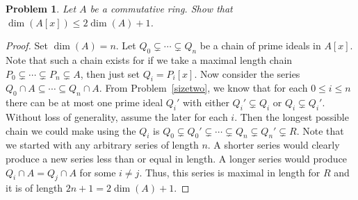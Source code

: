 \documentclass{article}
\newtheorem{problem}{Problem}
\begin{document}
\begin{problem}
Let $A$ be a commutative ring. Show that $\dim(A[x]) \leq 2 \dim(A) + 1$.
\end{problem}
\begin{proof}
Set $\dim(A) = n$. Let $Q_0 \subsetneq \cdots \subsetneq Q_n$ be a chain of prime ideals in $A[x]$. Note that such a chain exists for if we take a maximal length chain $P_0 \subsetneq \cdots \subsetneq P_n \subsetneq A$, then just set $Q_i = P_i[x]$. Now consider the series $Q_0 \cap A \subseteq \cdots \subseteq Q_n \cap A$. From Problem~\ref{sizetwo}, we know that for each $0 \leq i \leq n$ there can be at most one prime ideal $Q_i'$ with either $Q_i' \subsetneq Q_i$ or $Q_i \subsetneq Q_i'$. Without loss of generality, assume the later for each $i$. Then the longest possible chain we could make using the $Q_i$ is $Q_0 \subsetneq Q_0' \subsetneq \cdots \subsetneq Q_n \subsetneq Q_n' \subsetneq R$. Note that we started with any arbitrary series of length $n$. A shorter series would clearly produce a new series less than or equal in length. A longer series would produce $Q_i \cap A = Q_j \cap A$ for some $i \neq j$. Thus, this series is maximal in length for $R$ and it is of length $2n + 1 = 2 \dim(A) + 1$.
\end{proof}
\end{document}
